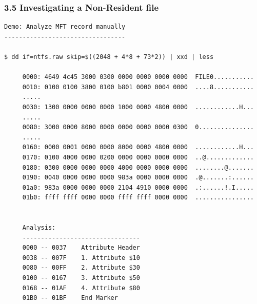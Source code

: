 \begin{frame}[fragile]
  \frametitle{3.5 Investigating a Non-Resident file}
  \begin{lstlisting}[basicstyle=\tiny]
Demo: Analyze MFT record manually
---------------------------------

$ dd if=ntfs.raw skip=$((2048 + 4*8 + 73*2)) | xxd | less

     0000: 4649 4c45 3000 0300 0000 0000 0000 0000  FILE0...........
     0010: 0100 0100 3800 0100 b801 0000 0004 0000  ....8...........
     .....
     0030: 1300 0000 0000 0000 1000 0000 4800 0000  ............H...
     .....
     0080: 3000 0000 8000 0000 0000 0000 0000 0300  0...............
     .....
     0160: 0000 0001 0000 0000 8000 0000 4800 0000  ............H...
     0170: 0100 4000 0000 0200 0000 0000 0000 0000  ..@.............
     0180: 0300 0000 0000 0000 4000 0000 0000 0000  ........@.......
     0190: 0040 0000 0000 0000 983a 0000 0000 0000  .@.......:......
     01a0: 983a 0000 0000 0000 2104 4910 0000 0000  .:......!.I.....
     01b0: ffff ffff 0000 0000 ffff ffff 0000 0000  ................


     Analysis:
     --------------------------------
     0000 -- 0037    Attribute Header
     0038 -- 007F    1. Attribute $10
     0080 -- 00FF    2. Attribute $30
     0100 -- 0167    3. Attribute $50
     0168 -- 01AF    4. Attribute $80
     01B0 -- 01BF    End Marker 
  \end{lstlisting}
\end{frame}


